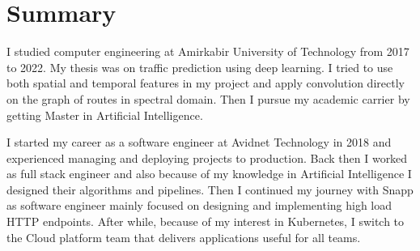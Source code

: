 \section{Summary}\closesection{}

I studied computer engineering at Amirkabir University of Technology from 2017 to 2022.
My thesis was on traffic prediction using deep learning.
I tried to use both spatial and temporal features in my project and apply
convolution directly on the graph of routes in spectral domain.
Then I pursue my academic carrier by getting Master in Artificial Intelligence.

I started my career as a software engineer at Avidnet Technology in 2018 and experienced managing
and deploying projects to production. Back then I worked as full stack engineer and also because
of my knowledge in Artificial Intelligence I designed their algorithms and pipelines.
Then I continued my journey with Snapp as software engineer mainly focused on designing and implementing
high load HTTP endpoints. After while, because of my interest in Kubernetes, I switch to the Cloud platform
team that delivers applications useful for all teams.